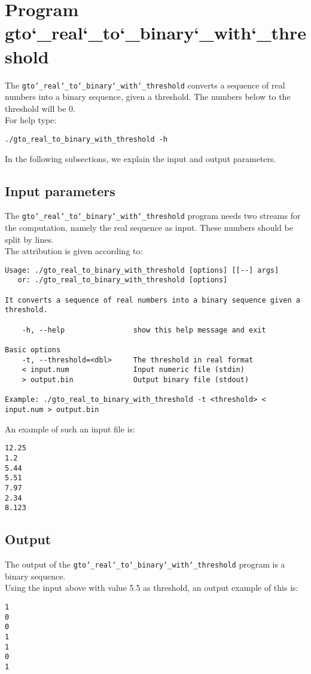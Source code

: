 \section{Program gto\char`_real\char`_to\char`_binary\char`_with\char`_threshold}
The \texttt{gto\char`_real\char`_to\char`_binary\char`_with\char`_threshold} converts a sequence of real numbers into a binary sequence, given a threshold. The numbers below to the threshold will be 0.\\
For help type:
\begin{lstlisting}
./gto_real_to_binary_with_threshold -h
\end{lstlisting}
In the following subsections, we explain the input and output parameters.

\subsection*{Input parameters}

The \texttt{gto\char`_real\char`_to\char`_binary\char`_with\char`_threshold} program needs two streams for the computation, namely the real sequence as input. These numbers should be split by lines.\\
The attribution is given according to:
\begin{lstlisting}
Usage: ./gto_real_to_binary_with_threshold [options] [[--] args]
   or: ./gto_real_to_binary_with_threshold [options]

It converts a sequence of real numbers into a binary sequence given a threshold.

    -h, --help                show this help message and exit

Basic options
    -t, --threshold=<dbl>     The threshold in real format
    < input.num               Input numeric file (stdin)
    > output.bin              Output binary file (stdout)

Example: ./gto_real_to_binary_with_threshold -t <threshold> < input.num > output.bin
\end{lstlisting}
An example of such an input file is:
\begin{lstlisting}
12.25
1.2
5.44
5.51
7.97
2.34
8.123
\end{lstlisting}

\subsection*{Output}
The output of the \texttt{gto\char`_real\char`_to\char`_binary\char`_with\char`_threshold} program is a binary sequence.\\
Using the input above with value 5.5 as threshold, an output example of this is:
\begin{lstlisting}
1
0
0
1
1
0
1
\end{lstlisting}